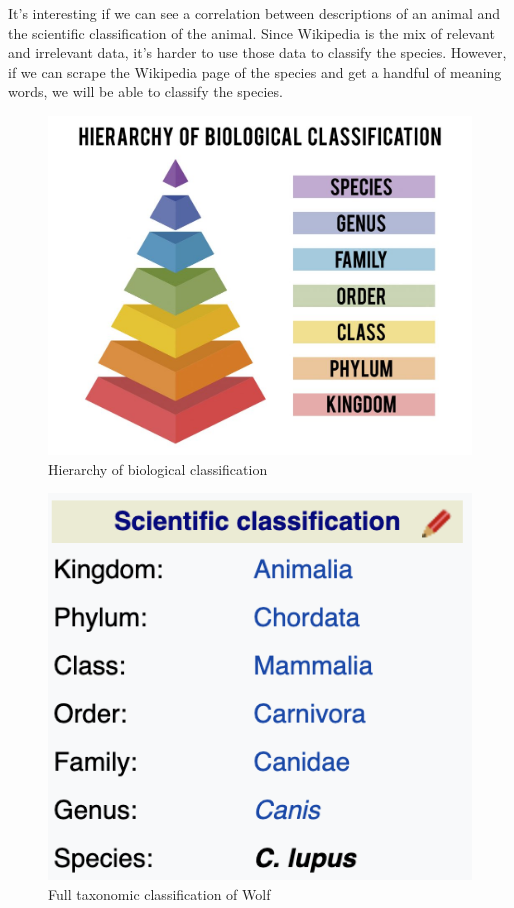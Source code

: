 \documentclass[10pt,twocolumn,letterpaper]{article}
\begin{document}
    It's interesting if we can see a correlation between descriptions of an animal and the scientific classification of the animal. Since Wikipedia is the mix of relevant and irrelevant data, it's harder to use those data to classify the species. However, if we can scrape the Wikipedia page of the species and get a handful of meaning words, we will be able to classify the species.

\begin{figure}
  \includegraphics[width=\linewidth]{taxonomy-1024x819.jpg}
  \caption{Hierarchy of biological classification}
  \label{fig:taxonomy_ranks}
\end{figure}

\begin{figure}
  \includegraphics[width=\linewidth]{wolf.png}
  \caption{Full taxonomic classification of Wolf}
  \label{fig:wolf}
\end{figure}
\end{document}
